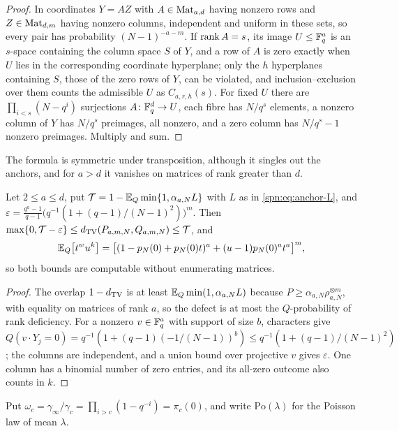 \begin{proof}
In coordinates $Y=AZ$ with $A\in\operatorname{Mat}_{a,d}$ having nonzero rows and $Z\in\operatorname{Mat}_{d,m}$ having nonzero
columns, independent and uniform in these sets, so every pair has probability $(N-1)^{-a-m}$. If
$\operatorname{rank} A=s$, its image $U\le\mathbb{F}_q^a$ is an $s$-space containing the column space $S$ of $Y$, and a row of
$A$ is zero exactly when $U$ lies in the corresponding coordinate hyperplane; only the $h$ hyperplanes
containing $S$, those of the zero rows of $Y$, can be violated, and inclusion--exclusion over them
counts the admissible $U$ as $C_{a,r,h}(s)$. For fixed $U$ there are $\prod_{i<s}(N-q^i)$ surjections
$A\colon\mathbb{F}_q^d\to U$, each fibre has $N/q^s$ elements, a nonzero column of $Y$ has $N/q^s$ preimages,
all nonzero, and a zero column has $N/q^s-1$ nonzero preimages. Multiply and sum.
\end{proof}

The formula is symmetric under transposition, although it singles out the anchors, and for $a>d$ it
vanishes on matrices of rank greater than $d$.

\begin{proposition}\label{spn:prop:anchors-finite}
Let $2\le a\le d$, put $\mathcal T=1-\mathbb{E}_Q\min\{1,\alpha_{a,N}L\}$ with $L$ as in
\eqref{spn:eq:anchor-L}, and
$\varepsilon=\frac{q^a-1}{q-1}\bigl(q^{-1}(1+(q-1)/(N-1)^2)\bigr)^m$. Then
$\max\{0,\mathcal T-\varepsilon\}\le d_{\mathrm{TV}}(P_{a,m,N},Q_{a,m,N})\le\mathcal T$, and
\[
 \mathbb{E}_Q\bigl[t^wu^k\bigr]=\bigl[(1-p_N(0)+p_N(0)t)^a+(u-1)p_N(0)^at^a\bigr]^m,
\]
so both bounds are computable without enumerating matrices.
\end{proposition}

\begin{proof}
The overlap $1-d_{\mathrm{TV}}$ is at least $\mathbb{E}_Q\min(1,\alpha_{a,N}L)$ because
$P\ge\alpha_{a,N}\rho_{a,N}^{\otimes m}$, with equality on matrices of rank $a$, so the defect is at most
the $Q$-probability of rank deficiency. For a nonzero $v\in\mathbb{F}_q^a$ with support of size $b$, characters
give $Q(v\cdot Y_j=0)=q^{-1}(1+(q-1)(-1/(N-1))^b)\le q^{-1}(1+(q-1)/(N-1)^2)$; the columns are
independent, and a union bound over projective $v$ gives $\varepsilon$. One column has a binomial number of
zero entries, and its all-zero outcome also counts in $k$.
\end{proof}

Put $\omega_c=\gamma_\infty/\gamma_c=\prod_{i>c}(1-q^{-i})=\pi_c(0)$, and write $\mathrm{Po}(\lambda)$ for
the Poisson law of mean $\lambda$.

